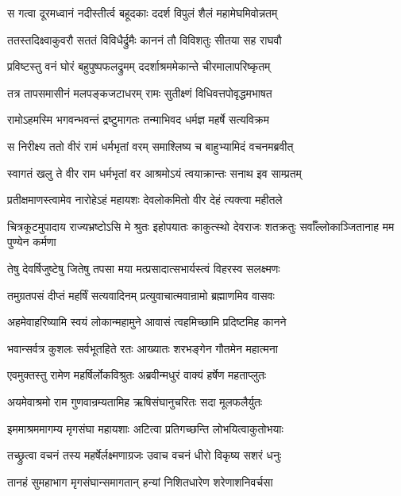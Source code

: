 \twolineshloka
{स गत्वा दूरमध्वानं नदीस्तीर्त्व बहूदकाः}
{ददर्श विपुलं शैलं महामेघमिवोन्नतम्} %

\twolineshloka
{ततस्तदिक्ष्वाकुवरौ सततं विविधैर्द्रुमैः}
{काननं तौ विविशतुः सीतया सह राघवौ} %

\twolineshloka
{प्रविष्टस्तु वनं घोरं बहुपुष्पफलद्रुमम्}
{ददर्शाश्रममेकान्ते चीरमालापरिष्कृतम्} %

\twolineshloka
{तत्र तापसमासीनं मलपङ्कजटाधरम्}
{रामः सुतीक्ष्णं विधिवत्तपोवृद्धमभाषत} %

\twolineshloka
{रामोऽहमस्मि भगवन्भवन्तं द्रष्टुमागतः}
{तन्माभिवद धर्मज्ञ महर्षे सत्यविक्रम} %

\twolineshloka
{स निरीक्ष्य ततो वीरं रामं धर्मभृतां वरम्}
{समाश्लिष्य च बाहुभ्यामिदं वचनमब्रवीत्} %

\twolineshloka
{स्वागतं खलु ते वीर राम धर्मभृतां वर}
{आश्रमोऽयं त्वयाक्रान्तः सनाथ इव साम्प्रतम्} %

\twolineshloka
{प्रतीक्षमाणस्त्वामेव नारोहेऽहं महायशः}
{देवलोकमितो वीर देहं त्यक्त्वा महीतले} %

\threelineshloka
{चित्रकूटमुपादाय राज्यभ्रष्टोऽसि मे श्रुतः}
{इहोपयातः काकुत्स्थो देवराजः शतक्रतुः}
{सर्वाँल्लोकाञ्जितानाह मम पुण्येन कर्मणा} %

\twolineshloka
{तेषु देवर्षिजुष्टेषु जितेषु तपसा मया}
{मत्प्रसादात्सभार्यस्त्वं विहरस्व सलक्ष्मणः} %

\twolineshloka
{तमुग्रतपसं दीप्तं महर्षिं सत्यवादिनम्}
{प्रत्युवाचात्मवान्रामो ब्रह्माणमिव वासवः} %

\twolineshloka
{अहमेवाहरिष्यामि स्वयं लोकान्महामुने}
{आवासं त्वहमिच्छामि प्रदिष्टमिह कानने} %

\twolineshloka
{भवान्सर्वत्र कुशलः सर्वभूतहिते रतः}
{आख्यातः शरभङ्गेन गौतमेन महात्मना} %

\twolineshloka
{एवमुक्तस्तु रामेण महर्षिर्लोकविश्रुतः}
{अब्रवीन्मधुरं वाक्यं हर्षेण महताप्लुतः} %

\twolineshloka
{अयमेवाश्रमो राम गुणवान्रम्यतामिह}
{ऋषिसंघानुचरितः सदा मूलफलैर्युतः} %

\twolineshloka
{इममाश्रममागम्य मृगसंघा महायशाः}
{अटित्वा प्रतिगच्छन्ति लोभयित्वाकुतोभयाः} %

\twolineshloka
{तच्छ्रुत्वा वचनं तस्य महर्षेर्लक्ष्मणाग्रजः}
{उवाच वचनं धीरो विकृष्य सशरं धनुः} %

\twolineshloka
{तानहं सुमहाभाग मृगसंघान्समागतान्}
{हन्यां निशितधारेण शरेणाशनिवर्चसा} %

